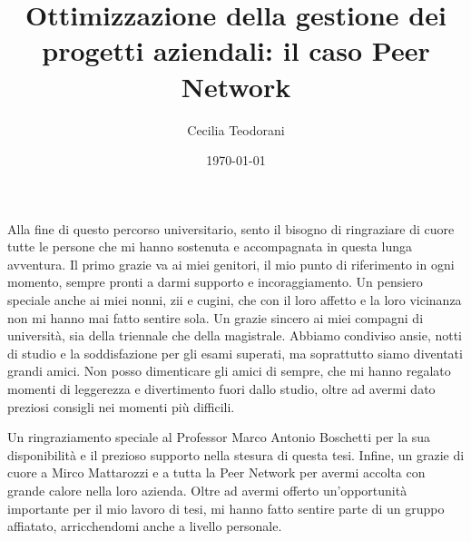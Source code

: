 \documentclass[12pt,a4paper,openright,twoside]{book}
\title{Ottimizzazione della gestione dei progetti aziendali: il caso Peer Network}
\author{Cecilia Teodorani}
\date{\today}
\begin{document}
\frontmatter\frontispiece




\tableofcontents   


\listoffigures 

\mainmatter















\backmatter




\begin{acknowledgements}
    Alla fine di questo percorso universitario, sento il bisogno di ringraziare di cuore tutte le persone che mi hanno sostenuta
    e accompagnata in questa lunga avventura.
    Il primo grazie va ai miei genitori, il mio punto di riferimento in ogni momento, sempre pronti a darmi supporto e
    incoraggiamento.
    Un pensiero speciale anche ai miei nonni, zii e cugini, che con il loro affetto e la loro vicinanza non mi hanno mai
    fatto sentire sola.
    Un grazie sincero ai miei compagni di università, sia della triennale che della magistrale. Abbiamo condiviso ansie,
    notti di studio e la soddisfazione per gli esami superati, ma soprattutto siamo diventati grandi amici.
    Non posso dimenticare gli amici di sempre, che mi hanno regalato momenti di leggerezza e divertimento fuori dallo studio,
    oltre ad avermi dato preziosi consigli nei momenti più difficili.

    Un ringraziamento speciale al Professor Marco Antonio Boschetti per la sua disponibilità e il prezioso supporto nella
    stesura di questa tesi.
    Infine, un grazie di cuore a Mirco Mattarozzi e a tutta la Peer Network per avermi accolta con grande calore nella
    loro azienda. Oltre ad avermi offerto un'opportunità importante per il mio lavoro di tesi, mi hanno fatto sentire
    parte di un gruppo affiatato, arricchendomi anche a livello personale.
\end{acknowledgements}
\end{document}
